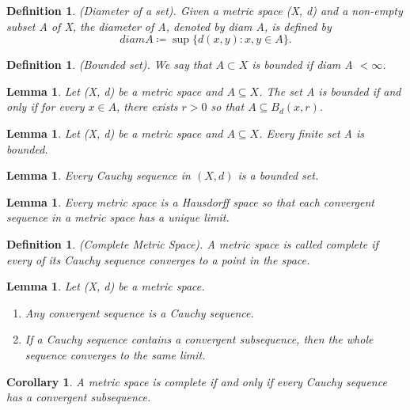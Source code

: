 \documentclass[twoside]{article}
\newtheorem{lemma}[theorem]{Lemma}
\newtheorem{corollary}[theorem]{Corollary}
\newtheorem{definition}[theorem]{Definition}
\begin{document}
\begin{definition}(Diameter of a set). Given a metric space (X, d) and a non-empty subset A of X, the diameter of A, denoted by diam A, is defined by $$diam A \coloneqq \sup\{d(x,y): x,y \in A\}. $$
\end{definition}

\begin{definition}(Bounded set). We say that $A \subset X$ is bounded if diam A $< \infty$.
\end{definition}

\begin{lemma} Let (X, d) be a metric space and $A \subseteq X$. The set A is bounded if and only if for every $x \in A$, there exists $r > 0$ so that $A \subseteq B_d(x,r)$.
\end{lemma}

\begin{lemma} Let (X, d) be a metric space and $A \subseteq X$. Every finite set A is bounded.
\end{lemma}

\begin{lemma} Every Cauchy sequence in $(X, d)$ is a bounded set.
\end{lemma}

\begin{lemma} Every metric space is a Hausdorff space so that each convergent sequence in a metric space has a unique limit.
\end{lemma}

\begin{definition}(Complete Metric Space). A metric space is called complete if every of its Cauchy sequence converges to a point in the space.
\end{definition}

\begin{lemma}Let (X, d) be a metric space.
\begin{enumerate}
\item Any convergent sequence is a Cauchy sequence.
\item If a Cauchy sequence contains a convergent subsequence, then the whole sequence converges to the same limit.
\end{enumerate}
\end{lemma}

\begin{corollary}A metric space is complete if and only if every Cauchy sequence has a convergent subsequence.
\end{corollary}
\end{document}
